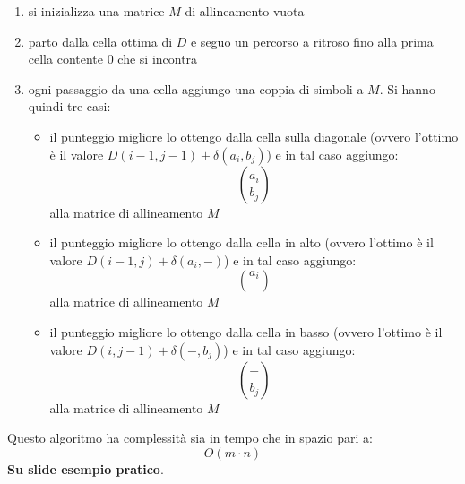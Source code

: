 \documentclass[a4paper,12pt, oneside]{book}
\begin{document}
\begin{enumerate}
  \item si inizializza una matrice $M$ di allineamento vuota
  \item parto dalla cella ottima di $D$ e seguo un percorso a ritroso fino alla
  prima cella contente 0 che si incontra
  \item ogni passaggio da una cella aggiungo una coppia di simboli a $M$.
  Si hanno quindi tre casi:
  \begin{itemize}
    \item il punteggio migliore lo ottengo dalla cella sulla diagonale (ovvero
    l'ottimo è il valore $D(i-1,j-1)+\delta(a_i,b_j)$) e in tal
    caso aggiungo:
    \[{{a_i}\choose{b_j}}\]
    alla matrice di allineamento $M$
    \item il punteggio migliore lo ottengo dalla cella in alto (ovvero
    l'ottimo è il valore $D(i-1,j)+\delta(a_i,-)$) e in tal caso
    aggiungo:
    \[{{a_i}\choose{-}}\]
    alla matrice di allineamento $M$
    \item il punteggio migliore lo ottengo dalla cella in basso (ovvero
    l'ottimo è il valore $D(i,j-1)+\delta(-,b_j)$) e in tal caso
    aggiungo:
    \[{{-}\choose{b_j}}\]
    alla matrice di allineamento $M$
  \end{itemize}
\end{enumerate}
Questo algoritmo ha complessità sia in tempo che in spazio pari a:
\[O(m\cdot n)\]
\textbf{Su slide esempio pratico}.
\end{document}
